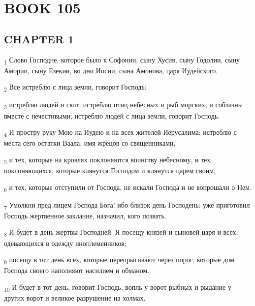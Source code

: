 \section{BOOK 105}
\subsection{CHAPTER 1}
\begin{tcolorbox}
\textsubscript{1} Слово Господне, которое было к Софонии, сыну Хусия, сыну Годолии, сыну Амории, сыну Езекии, во дни Иосии, сына Амонова, царя Иудейского.
\end{tcolorbox}
\begin{tcolorbox}
\textsubscript{2} Все истреблю с лица земли, говорит Господь:
\end{tcolorbox}
\begin{tcolorbox}
\textsubscript{3} истреблю людей и скот, истреблю птиц небесных и рыб морских, и соблазны вместе с нечестивыми; истреблю людей с лица земли, говорит Господь.
\end{tcolorbox}
\begin{tcolorbox}
\textsubscript{4} И простру руку Мою на Иудею и на всех жителей Иерусалима: истреблю с места сего остатки Ваала, имя жрецов со священниками,
\end{tcolorbox}
\begin{tcolorbox}
\textsubscript{5} и тех, которые на кровлях поклоняются воинству небесному, и тех поклоняющихся, которые клянутся Господом и клянутся царем своим,
\end{tcolorbox}
\begin{tcolorbox}
\textsubscript{6} и тех, которые отступили от Господа, не искали Господа и не вопрошали о Нем.
\end{tcolorbox}
\begin{tcolorbox}
\textsubscript{7} Умолкни пред лицем Господа Бога! ибо близок день Господень: уже приготовил Господь жертвенное заклание, назначил, кого позвать.
\end{tcolorbox}
\begin{tcolorbox}
\textsubscript{8} И будет в день жертвы Господней: Я посещу князей и сыновей царя и всех, одевающихся в одежду иноплеменников;
\end{tcolorbox}
\begin{tcolorbox}
\textsubscript{9} посещу в тот день всех, которые перепрыгивают через порог, которые дом Господа своего наполняют насилием и обманом.
\end{tcolorbox}
\begin{tcolorbox}
\textsubscript{10} И будет в тот день, говорит Господь, вопль у ворот рыбных и рыдание у других ворот и великое разрушение на холмах.
\end{tcolorbox}
